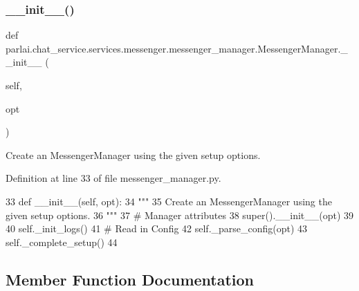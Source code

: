 \subsubsection{\texorpdfstring{\+\_\+\+\_\+init\+\_\+\+\_\+()}{\_\_init\_\_()}}
{\footnotesize\ttfamily def parlai.\+chat\+\_\+service.\+services.\+messenger.\+messenger\+\_\+manager.\+Messenger\+Manager.\+\_\+\+\_\+init\+\_\+\+\_\+ (\begin{DoxyParamCaption}\item[{}]{self,  }\item[{}]{opt }\end{DoxyParamCaption})}

\begin{DoxyVerb}Create an MessengerManager using the given setup options.
\end{DoxyVerb}
 

Definition at line 33 of file messenger\+\_\+manager.\+py.


\begin{DoxyCode}
33     \textcolor{keyword}{def }\_\_init\_\_(self, opt):
34         \textcolor{stringliteral}{"""}
35 \textcolor{stringliteral}{        Create an MessengerManager using the given setup options.}
36 \textcolor{stringliteral}{        """}
37         \textcolor{comment}{# Manager attributes}
38         super().\_\_init\_\_(opt)
39 
40         self.\_init\_logs()
41         \textcolor{comment}{# Read in Config}
42         self.\_parse\_config(opt)
43         self.\_complete\_setup()
44 
\end{DoxyCode}


\subsection{Member Function Documentation}
\mbox{\label{classparlai_1_1chat__service_1_1services_1_1messenger_1_1messenger__manager_1_1MessengerManager_ade5e639c76e2c48815c079d515ecaf9b}} 

